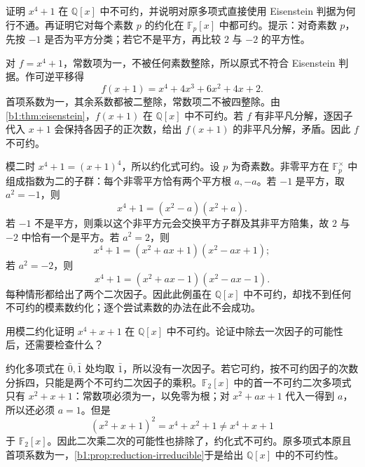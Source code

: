 \begin{exercise}\label{b1:ex:12-shift-eisenstein}
	证明 \(x^4+1\) 在 \(\mathbb Q[x]\) 中不可约，并说明对原多项式直接使用 Eisenstein 判据为何行不通。再证明它对每个素数 \(p\) 的约化在 \(\mathbb F_p[x]\) 中都可约。提示：对奇素数 \(p\)，先按 \(-1\) 是否为平方分类；若它不是平方，再比较 \(2\) 与 \(-2\) 的平方性。
\end{exercise}
\begin{solution}
	对 \(f=x^4+1\)，常数项为一，不被任何素数整除，所以原式不符合 Eisenstein 判据。作可逆平移得
	\[
		f(x+1)=x^4+4x^3+6x^2+4x+2.
	\]
	首项系数为一，其余系数都被二整除，常数项二不被四整除。由\cref{b1:thm:eisenstein}，\(f(x+1)\) 在 \(\mathbb Q[x]\) 中不可约。若 \(f\) 有非平凡分解，逐因子代入 \(x+1\) 会保持各因子的正次数，给出 \(f(x+1)\) 的非平凡分解，矛盾。因此 \(f\) 不可约。

	模二时 \(x^4+1=(x+1)^4\)，所以约化式可约。设 \(p\) 为奇素数。非零平方在 \(\mathbb F_p^\times\) 中组成指数为二的子群：每个非零平方恰有两个平方根 \(a,-a\)。若 \(-1\) 是平方，取 \(a^2=-1\)，则
	\[
		x^4+1=(x^2-a)(x^2+a).
	\]
	若 \(-1\) 不是平方，则乘以这个非平方元会交换平方子群及其非平方陪集，故 \(2\) 与 \(-2\) 中恰有一个是平方。若 \(a^2=2\)，则
	\[
		x^4+1=(x^2+ax+1)(x^2-ax+1);
	\]
	若 \(a^2=-2\)，则
	\[
		x^4+1=(x^2+ax-1)(x^2-ax-1).
	\]
	每种情形都给出了两个二次因子。因此此例虽在 \(\mathbb Q[x]\) 中不可约，却找不到任何不可约的模素数约化；逐个尝试素数的办法在此不会成功。
\end{solution}

\begin{exercise}\label{b1:ex:12-quartic-mod-two}
	用模二约化证明 \(x^4+x+1\) 在 \(\mathbb Q[x]\) 中不可约。论证中除去一次因子的可能性后，还需要检查什么？
\end{exercise}
\begin{solution}
	约化多项式在 \(\bar0,\bar1\) 处均取 \(\bar1\)，所以没有一次因子。若它可约，按不可约因子的次数分拆四，只能是两个不可约二次因子的乘积。\(\mathbb F_2[x]\) 中的首一不可约二次多项式只有 \(x^2+x+1\)：常数项必须为一，以免零为根；对 \(x^2+ax+1\) 代入一得到 \(a\)，所以还必须 \(a=1\)。但是
	\[
		(x^2+x+1)^2=x^4+x^2+1\ne x^4+x+1
	\]
	于 \(\mathbb F_2[x]\)。因此二次乘二次的可能性也排除了，约化式不可约。原多项式本原且首项系数为一，\cref{b1:prop:reduction-irreducible}于是给出 \(\mathbb Q[x]\) 中的不可约性。
\end{solution}

